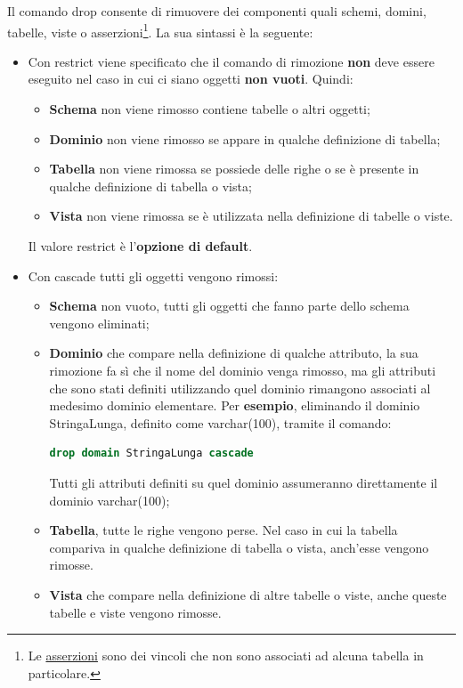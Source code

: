 \documentclass[a4paper]{article}
\begin{document}
	Il comando \textsf{drop} consente di rimuovere dei componenti quali schemi, domini, tabelle, viste o asserzioni\footnote{Le \href{https://stackoverflow.com/questions/2443322/what-is-the-difference-between-triggers-assertions-and-checks-in-database}{asserzioni} sono dei vincoli che non sono associati ad alcuna tabella in particolare.}. La sua sintassi è la seguente:
	
	\begin{itemize}
		\item Con \textsf{restrict} viene specificato che il comando di rimozione \textbf{non} deve essere eseguito nel caso in cui ci siano oggetti \textbf{non vuoti}. Quindi:
		\begin{itemize}
			\item \textbf{Schema} non viene rimosso contiene tabelle o altri oggetti;
		
			\item \textbf{Dominio} non viene rimosso  se appare in qualche definizione di tabella;
		
			\item \textbf{Tabella} non viene rimossa se possiede delle righe o se è presente in qualche definizione di tabella o vista;
		
			\item \textbf{Vista} non viene rimossa se è utilizzata nella definizione di tabelle o viste.
		\end{itemize}
		Il valore \textsf{restrict} è l'\textbf{opzione di default}.
		
		\item Con \textsf{cascade} tutti gli oggetti vengono rimossi:
		\begin{itemize}
			\item \textbf{Schema} non vuoto, tutti gli oggetti che fanno parte dello schema vengono eliminati;
			
			\item \textbf{Dominio} che compare nella definizione di qualche attributo, la sua rimozione fa sì che il nome del dominio venga rimosso, ma gli attributi che sono stati definiti utilizzando quel dominio rimangono associati al medesimo dominio elementare.\newline
			Per \textcolor{Green4}{\textbf{esempio}}, eliminando il dominio \textsf{StringaLunga}, definito come \textsf{varchar(100)}, tramite il comando:
\begin{lstlisting}[language=SQL]
drop domain StringaLunga cascade\end{lstlisting}
			Tutti gli attributi definiti su quel dominio assumeranno direttamente il dominio \textsf{varchar(100)};
			
			\item \textbf{Tabella}, tutte le righe vengono perse. Nel caso in cui la tabella compariva in qualche definizione di tabella o vista, anch'esse vengono rimosse.
			
			\item \textbf{Vista} che compare nella definizione di altre tabelle o viste, anche queste tabelle e viste vengono rimosse.
		\end{itemize}
	\end{itemize}
\end{document}
